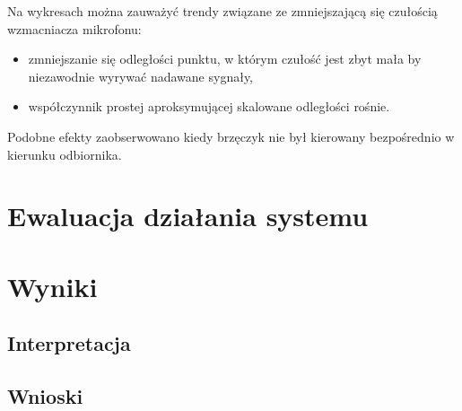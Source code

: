 Na wykresach można zauważyć trendy związane ze zmniejszającą się czułością wzmacniacza mikrofonu:

\begin{itemize}
    \item zmniejszanie się odległości punktu, w którym czułość jest zbyt mała by niezawodnie wyrywać nadawane sygnały,
    \item współczynnik prostej aproksymującej skalowane odległości rośnie.
\end{itemize}

Podobne efekty zaobserwowano kiedy brzęczyk nie był kierowany bezpośrednio w kierunku odbiornika.



\section{Ewaluacja działania systemu}

\section{Wyniki}

\subsection{Interpretacja}

\subsection{Wnioski}